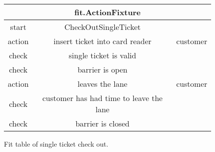 \begin{figure}[H]
\begin{centering}
\begin{tabular}{|c|c|c|}
\hline 
\multicolumn{3}{|c|}{fit.ActionFixture}\tabularnewline
\hline 
start & CheckOutSingleTicket & \tabularnewline
\hline 
action & insert ticket into card reader & customer\tabularnewline
\hline 
check & single ticket is valid & \tabularnewline
\hline 
check & barrier is open & \tabularnewline
\hline 
action & leaves the lane & customer\tabularnewline
\hline 
check & customer has had time to leave the lane & \tabularnewline
\hline 
check & barrier is closed & \tabularnewline
\hline 
\end{tabular}
\caption{Fit table of single ticket check out.}
\end{centering}
\end{figure}
